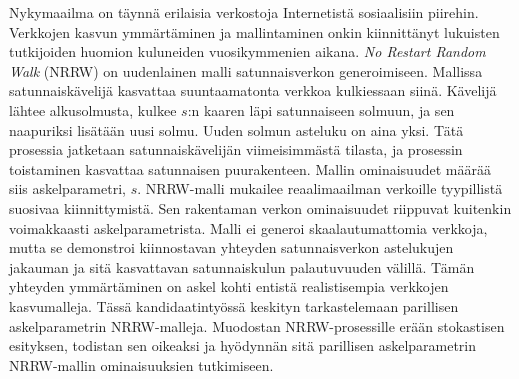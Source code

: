 \documentclass[finnish, 12pt, a4paper, sci, utf8, pdfa]{aaltothesis}
\date{12.5.2018}
\begin{document}
	
\makecoverpage

\makecopyrightpage

\begin{abstractpage}[finnish]
Nykymaailma on täynnä erilaisia verkostoja Internetistä sosiaalisiin piirehin. Verkkojen kasvun ymmärtäminen ja mallintaminen
onkin kiinnittänyt lukuisten tutkijoiden huomion kuluneiden vuosikymmenien aikana.
\textit{No Restart Random Walk} (NRRW) on uudenlainen malli satunnaisverkon generoimiseen. Mallissa satunnaiskävelijä kasvattaa suuntaamatonta verkkoa 
kulkiessaan siinä. Kävelijä lähtee alkusolmusta, kulkee $ s $:n kaaren läpi satunnaiseen solmuun, ja sen naapuriksi lisätään 
uusi solmu. Uuden solmun asteluku on aina yksi. Tätä prosessia jatketaan satunnaiskävelijän viimeisimmästä tilasta, ja prosessin 
toistaminen kasvattaa satunnaisen puurakenteen. Mallin ominaisuudet määrää siis askelparametri, $ s $. 
NRRW-malli mukailee reaalimaailman verkoille tyypillistä suosivaa kiinnittymistä. Sen rakentaman verkon ominaisuudet riippuvat 
kuitenkin voimakkaasti askelparametrista. Malli ei generoi skaalautumattomia verkkoja, mutta se demonstroi kiinnostavan yhteyden 
satunnaisverkon astelukujen jakauman ja sitä kasvattavan satunnaiskulun palautuvuuden välillä. Tämän yhteyden ymmärtäminen on askel 
kohti entistä realistisempia verkkojen kasvumalleja. Tässä kandidaatintyössä keskityn tarkastelemaan parillisen askelparametrin 
NRRW-malleja. Muodostan NRRW-prosessille erään stokastisen esityksen, todistan sen oikeaksi ja hyödynnän sitä parillisen askelparametrin 
NRRW-mallin ominaisuuksien tutkimiseen.
\end{abstractpage}

\end{document}
